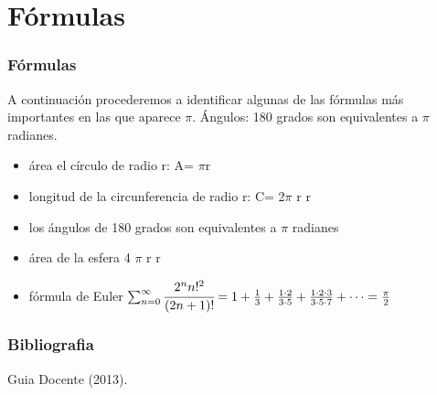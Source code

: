 \documentclass{beamer}
\begin{document}
\section {Fórmulas}
\begin{frame}
\frametitle{Fórmulas}
\begin{block}
A continuación procederemos a identificar algunas de las fórmulas más importantes en las que aparece $\pi$.
%
%
%
Ángulos: 180 grados son equivalentes a $\pi$ radianes.
%
%
\begin{itemize}
\item área el círculo de radio r: A= $\pi$r    \pause
\item longitud de la circunferencia de radio r: C= 2$\pi$ r r   \pause
\item los ángulos de 180 grados son equivalentes a $\pi$ radianes    \pause
\item área de la esfera 4 $\pi$ r r
\item fórmula de Euler $\sum_{n=0}^{\infty }\cfrac{2^n n!^2}{(2n + 1)!}=1 + \frac{1}{3} + \frac{1 \cdot 2}{3 \cdot 5} + \frac{1 \cdot 2 \cdot 3}{3 \cdot 5 \cdot 7} + \cdots = \frac{\pi}{2}$
%
\end{itemize}
%
\end{block}
\end{frame}

\begin{frame}
\frametitle{Bibliografia}
\begin{thebibliography}{10}
Guia Docente (2013).
\end{thebibliography}
\end{frame}
\end{document}
